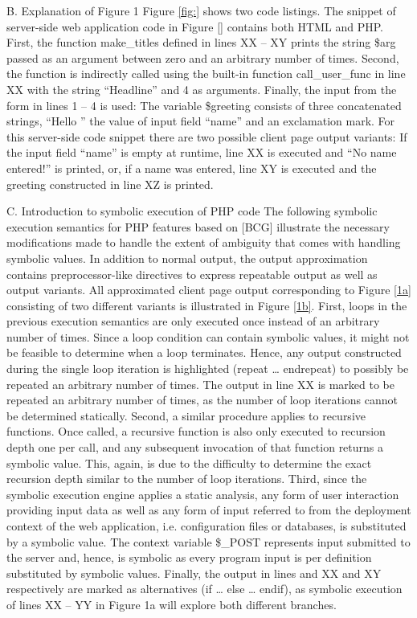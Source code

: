 \documentclass[preprint]{sig-alternate-05-2015}
\begin{document}
B. Explanation of Figure 1
Figure \ref{fig:} shows two code listings. The snippet of server-side web application code in Figure \ref{} contains both HTML and PHP. First, the function make\_titles defined in lines XX – XY prints the string \$arg passed as an argument between zero and an arbitrary number of times. Second, the function is indirectly called using the built-in function call\_user\_func in line XX with the string “Headline” and 4 as arguments.  Finally, the input from the form in lines 1 – 4 is used: The variable \$greeting consists of three concatenated strings, “Hello ” the value of input field “name” and an exclamation mark. For this server-side code snippet there are two possible client page output variants: If the input field “name” is empty at runtime, line XX is executed and “No name entered!” is printed, or, if a name was entered, line XY is executed and the greeting constructed in line XZ is printed.

C. Introduction to symbolic execution of PHP code
The following symbolic execution semantics for PHP features  based on [BCG] illustrate the necessary modifications made to handle the extent of ambiguity that comes with handling symbolic values. In addition to normal output, the output approximation contains preprocessor-like directives to express repeatable output as well as output variants. All approximated client page output corresponding to Figure \ref{1a} consisting of two different variants is illustrated in Figure \ref{1b}. 
First, loops in the previous execution semantics are only executed once instead of an arbitrary number of times. Since a loop condition can contain symbolic values, it might not be feasible to determine when a loop terminates. Hence, any output constructed during the single loop iteration is highlighted (repeat … endrepeat) to possibly be repeated an arbitrary number of times. The output in line XX is marked to be repeated an arbitrary number of times, as the number of loop iterations cannot be determined statically. Second, a similar procedure applies to recursive functions. Once called, a recursive function is  also only executed to recursion depth one per call, and any subsequent invocation of that function returns a symbolic value. This, again, is due to the difficulty to determine the exact recursion depth similar to the number of loop iterations. Third, since the symbolic execution engine applies a static analysis, any form of user interaction providing input data as well as any form of input referred to from the deployment context of the web application, i.e. configuration files or databases, is substituted by a symbolic value. The context variable \$\_POST represents input submitted to the server and, hence, is symbolic as every program input is per definition substituted by symbolic values. Finally, the output in lines and XX and XY respectively are marked as alternatives (if … else … endif), as symbolic execution of lines XX – YY in Figure 1a will explore both different branches.
\end{document}
